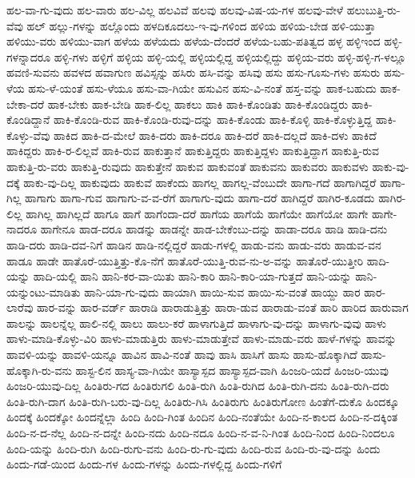 {ಹಲ-ವಾ-ಗು-ವುದು
ಹಲ-ವಾರು
ಹಲ-ವಿಲ್ಲ
ಹಲವಿವೆ
ಹಲವು
ಹಲವು-ವಿಷ-ಯ-ಗಳ
ಹಲವು-ವೇಳೆ
ಹಲುಬುತ್ತಿ-ರು-ವೆವು
ಹಲ್
ಹಲ್ಲು-ಗಳನ್ನು
ಹಲ್ಲೊಂದು
ಹಳದಿಕೂದಲು-ಇ-ವು-ಗಳಿಂದ
ಹಳಿಯ
ಹಳಿಯ-ಬೇಡ
ಹಳಿ-ಯುತ್ತಾ
ಹಳಿಯು-ವರು
ಹಳಿಯು-ವಾಗ
ಹಳೆಯ
ಹಳೆಯದು
ಹಳೆಯ-ದೆಂದರೆ
ಹಳೆಯ-ಬಹು-ಪತಿತ್ವದ
ಹಳ್ಳ
ಹಳ್ಳಿಇಂದ
ಹಳ್ಳಿ-ಗಳನ್ನಾದರೂ
ಹಳ್ಳಿ-ಗಳು
ಹಳ್ಳಿಗೆ
ಹಳ್ಳಿಯ
ಹಳ್ಳಿ-ಯಲ್ಲಿ
ಹಳ್ಳಿಯಲ್ಲಿದ್ದ
ಹಳ್ಳಿಯಲ್ಲಿದ್ದು
ಹಳ್ಳಿಯ-ವರು
ಹಳ್ಳಿ-ಹಳ್ಳಿ-ಗ-ಳಲ್ಲೂ
ಹವಣಿ-ಸುವನು
ಹವಳದ
ಹವಾಗುಣ
ಹವಿಸ್ಸನ್ನು
ಹಸಿರು
ಹಸಿ-ವನ್ನು
ಹಸಿವು
ಹಸು
ಹಸು-ಗೂಸು-ಗಳು
ಹಸುರು
ಹಸು-ಳೆಯ
ಹಸು-ಳೆ-ಯಂತೆ
ಹಸು-ಳೆಯೂ
ಹಸು-ವಾ-ಗಿಯೇ
ಹಸುವಿನ
ಹಸು-ವಿ-ನಂತೆ
ಹಸ್ತ-ವನ್ನು
ಹಾಕ-ಬಹುದು
ಹಾಕ-ಬೇಕಾ-ದರೆ
ಹಾಕ-ಬೇಕು
ಹಾಕ-ಬೇಡಿ
ಹಾಕ-ಲಿಲ್ಲ
ಹಾಕಲು
ಹಾಕಿ
ಹಾಕಿ-ಕೊಂಡಿತು
ಹಾಕಿ-ಕೊಂಡಿದ್ದರು
ಹಾಕಿ-ಕೊಂಡಿದ್ದಾನೆ
ಹಾಕಿ-ಕೊಂಡಿ-ರುವ
ಹಾಕಿ-ಕೊಂಡಿ-ರುವು-ದನ್ನು
ಹಾಕಿ-ಕೊಂಡು
ಹಾಕಿ-ಕೊಳ್ಳಿ
ಹಾಕಿ-ಕೊಳ್ಳುತ್ತಿದ್ದ
ಹಾಕಿ-ಕೊಳ್ಳು-ವೆವು
ಹಾಕಿದ
ಹಾಕಿ-ದ-ಮೇಲೆ
ಹಾಕಿ-ದರು
ಹಾಕಿ-ದರೂ
ಹಾಕಿ-ದರೆ
ಹಾಕಿ-ದಲ್ಲದೆ
ಹಾಕಿ-ದಳು
ಹಾಕಿದೆ
ಹಾಕಿದ್ದರು
ಹಾಕಿ-ರ-ಲಿಲ್ಲವೆ
ಹಾಕಿ-ರುವ
ಹಾಕುತ್ತಾನೆ
ಹಾಕುತ್ತಿದ್ದರು
ಹಾಕುತ್ತಿದ್ದಳು
ಹಾಕುತ್ತಿದ್ದಾಗ
ಹಾಕುತ್ತಿ-ರುವ
ಹಾಕುತ್ತಿ-ರು-ವರು
ಹಾಕುತ್ತಿ-ರುವುದು
ಹಾಕುತ್ತೇನೆ
ಹಾಕುವ
ಹಾಕುವಂತೆ
ಹಾಕುವನು
ಹಾಕುವರು
ಹಾಕುವಳು
ಹಾಕು-ವು-ದಕ್ಕೆ
ಹಾಕು-ವು-ದಿಲ್ಲ
ಹಾಕುವುದು
ಹಾಕುವೆ
ಹಾಕೆಂದು
ಹಾಗಲ್ಲ
ಹಾಗಲ್ಲ-ವೆಂಬುದೇ
ಹಾಗಾ-ಗದೆ
ಹಾಗಾಗಿದ್ದರೆ
ಹಾಗಾ-ಗಿಲ್ಲ
ಹಾಗಾಗು
ಹಾಗಾ-ಗುವ
ಹಾಗಾಗು-ವ-ವ-ರೆಗೆ
ಹಾಗಾಗು-ವುದು
ಹಾಗಾ-ದರೆ
ಹಾಗಿದ್ದರೆ
ಹಾಗಿರ-ಕೂಡದು
ಹಾಗಿರ-ಲಿಲ್ಲ
ಹಾಗಿಲ್ಲ
ಹಾಗಿಲ್ಲದೆ
ಹಾಗೂ
ಹಾಗೆ
ಹಾಗೆಂದಾ-ದರೆ
ಹಾಗೆಯ
ಹಾಗೆಯೆ
ಹಾಗೆಯೇ
ಹಾಗೆಯೋ
ಹಾಗೇ
ಹಾಗೇ-ನಾದರೂ
ಹಾಗೇನೂ
ಹಾಡ-ದರೂ
ಹಾಡನ್ನು
ಹಾಡನ್ನೇ
ಹಾಡ-ಬೇಕೆಂಬು-ದನ್ನು
ಹಾಡಾ-ದರೂ
ಹಾಡಿ
ಹಾಡಿ-ದನು
ಹಾಡಿ-ದರು
ಹಾಡಿ-ದವ-ನಿಗೆ
ಹಾಡಿನ
ಹಾಡಿ-ನಲ್ಲಿದ್ದರೆ
ಹಾಡು-ಗಳಲ್ಲಿ
ಹಾಡು-ವನು
ಹಾಡು-ವರು
ಹಾಡುವ-ವನ
ಹಾಡೂ
ಹಾಡೇ
ಹಾತೊರೆ-ಯುತ್ತಿತ್ತು-ಕೊ-ನೆಗೆ
ಹಾತೊರೆ-ಯುತ್ತಿ-ರುವ-ನು-ಅ-ವನ್ನು
ಹಾತೊರೆ-ಯುತ್ತೀರಿ
ಹಾದಿ-ಯನ್ನು
ಹಾದಿ-ಯಲ್ಲಿ
ಹಾನಿ
ಹಾನಿ-ಕರ-ವಾ-ಯಿತು
ಹಾನಿ-ಕಾರಿ
ಹಾನಿ-ಕಾರಿ-ಯಾ-ಗುತ್ತದೆ
ಹಾನಿ-ಯನ್ನು
ಹಾನಿ-ಯನ್ನುಂಟು-ಮಾಡಿತು
ಹಾನಿ-ಯಾ-ಗು-ವುದು
ಹಾಯಾಗಿ
ಹಾಯಿ-ಸುವ
ಹಾಯಿ-ಸು-ವಂತೆ
ಹಾಯ್ದು
ಹಾರ
ಹಾರ-ಲಾರೆವು
ಹಾರ-ವನ್ನು
ಹಾರ-ವರ್ಡ್
ಹಾರಾಡಿ
ಹಾರಾಡುತ್ತಿತ್ತು
ಹಾರಾ-ಡುವ
ಹಾರಾಡು-ವಂತೆ
ಹಾರಿ
ಹಾರಿದ
ಹಾರುವಾಗ
ಹಾಲನ್ನು
ಹಾಲನ್ನೆಲ್ಲ
ಹಾಲಿ-ನಲ್ಲಿ
ಹಾಲು
ಹಾಲು-ಕರೆ
ಹಾಳಾಗುತ್ತಿದೆ
ಹಾಳಾಗು-ವು-ದನ್ನು
ಹಾಳಾಗು-ವುವು
ಹಾಳು
ಹಾಳು-ಮಾಡಿ-ಕೊಳ್ಳು-ವಿರಿ
ಹಾಳು-ಮಾಡುತ್ತಿರು
ಹಾಳು-ಮಾಡುತ್ತೇವೆ
ಹಾಳು-ಮಾಡು-ವರು
ಹಾಳೆ-ಗಳನ್ನು
ಹಾವನ್ನು
ಹಾವಳಿ-ಯನ್ನು
ಹಾವಳಿ-ಯನ್ನೂ
ಹಾವಿನ
ಹಾವಿ-ನಂತೆ
ಹಾವು
ಹಾಸಿ
ಹಾಸಿಗೆ
ಹಾಸು
ಹಾಸು-ಹೊಕ್ಕಾಗಿದೆ
ಹಾಸು-ಹೊಕ್ಕಾಗಿ-ರು-ವನು
ಹಾಸ್ಟ-ಲಿನ
ಹಾಸ್ಯ-ವಾ-ಗಿಯೇ
ಹಾಸ್ಯಾಸ್ಪದ
ಹಾಸ್ಯಾಸ್ಪದ-ವಾಗಿ
ಹಿಂಜರಿ-ಯದೆ
ಹಿಂಜರಿ-ಯುವು
ಹಿಂಜರಿ-ಯುವು-ದಿಲ್ಲ
ಹಿಂತಿರು-ಗದ
ಹಿಂತಿರುಗಲಿ
ಹಿಂತಿ-ರುಗಿ
ಹಿಂತಿ-ರುಗಿದ
ಹಿಂತಿ-ರುಗಿ-ದನು
ಹಿಂತಿ-ರುಗಿ-ದರು
ಹಿಂತಿ-ರುಗಿ-ದಾಗ
ಹಿಂತಿ-ರುಗಿ-ಬರು-ವು-ದಿಲ್ಲ
ಹಿಂತಿರು-ಗಿಸಿ
ಹಿಂತಿರುಗು
ಹಿಂತಿರುಗೋಣ
ಹಿಂತೆಗೆ-ದುಕೊ
ಹಿಂದಕ್ಕೂ
ಹಿಂದಕ್ಕೆ
ಹಿಂದಕ್ಕೋ
ಹಿಂದನ್ನೆಲ್ಲಾ
ಹಿಂದಿ
ಹಿಂದಿ-ಗಿಂತ
ಹಿಂದಿನ
ಹಿಂದಿ-ನಂತೆಯೇ
ಹಿಂದಿ-ನ-ಕಾಲದ
ಹಿಂದಿ-ನ-ದಕ್ಕಿಂತ
ಹಿಂದಿ-ನ-ದ-ನೆಲ್ಲ
ಹಿಂದಿ-ನ-ದನ್ನೇ
ಹಿಂದಿ-ನದು
ಹಿಂದಿ-ನದೂ
ಹಿಂದಿ-ನ-ವ-ನಿ-ಗಿಂತ
ಹಿಂದಿ-ನಿಂದ
ಹಿಂದಿ-ನಿಂದಲೂ
ಹಿಂದಿ-ಯನ್ನು
ಹಿಂದಿ-ರುಗಿ
ಹಿಂದಿ-ರುಗು-ವನು
ಹಿಂದಿ-ರು-ಗು-ವುದು
ಹಿಂದಿ-ರುವ
ಹಿಂದಿ-ರು-ವು-ದನ್ನು
ಹಿಂದು
ಹಿಂದು-ಗಡೆ-ಯಿಂದ
ಹಿಂದು-ಗಳ
ಹಿಂದು-ಗಳನ್ನು
ಹಿಂದು-ಗಳಲ್ಲಿದ್ದ
ಹಿಂದು-ಗಳಿಗೆ
}
